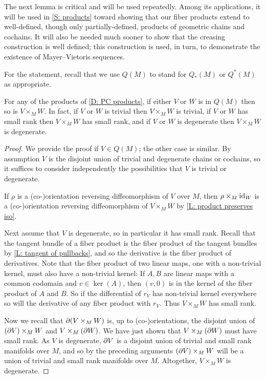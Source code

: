 The next lemma is critical and will be used repeatedly.
Among its applications, it will be used in \cref{S: products} toward showing that our fiber products extend to well-defined, though only partially-defined, products of geometric chains and cochains.
It will also be needed much sooner to show that the creasing construction is well defined; this construction is used, in turn, to demonstrate the existence of Mayer--Vietoris sequences.

For the statement, recall that we use $Q(M)$ to stand for $Q_*(M)$ or $Q^*(M)$ as appropriate.

\begin{lemma}\label{L: pullback with Q}
	For any of the products of \cref{D: PC products}, if either $V$ or $W$ is in $Q(M)$ then so is $V \times_M W$.
	In fact, if $V$ or $W$ is trivial then $V \times_M W$ is trivial, if $V$ or $W$ has small rank then $V \times_M W$ has small rank, and if $V$ or $W$ is degenerate then $V \times_M W$ is degenerate.
\end{lemma}

\begin{proof}
	We provide the proof if $V \in Q(M)$; the other case is similar.
	By assumption $V$ is the disjoint union of trivial and degenerate chains or cochains, so it suffices to consider independently the possibilities that $V$ is trivial or degenerate.

	If $\rho$ is a (co\nobreakdash-)orientation reversing diffeomorphism of $V$ over $M$, then $\rho \times_M \mathrm{id}_W$ is a (co\nobreakdash-)orientation reversing diffeomorphism of $V \times_M W$ by \cref{L: product preserves iso}.

	Next assume that $V$ is degenerate, so in particular it has small rank.
	Recall that the tangent bundle of a fiber product is the fiber product of the tangent bundles by \cref{L: tangent of pullbacks}, and so the derivative is the fiber product of derivatives.
	Note that the fiber product of two linear maps, one with a non-trivial kernel, must also have a non-trivial kernel: If $A,B$ are linear maps with a common codomain and $v \in \ker(A)$, then $(v,0)$ is in the kernel of the fiber product of $A$ and $B$.
	So if the differential of $r_V$ has non-trivial kernel everywhere so will the derivative of any fiber product with $r_V$.
	Thus $V \times_M W$ has small rank.

	Now we recall that $\partial(V \times_M W)$ is, up to (co\nobreakdash-)orientations, the disjoint union of $(\partial V) \times_M W$ and $V \times_M (\partial W)$.
	We have just shown that $V \times_M (\partial W)$ must have small rank.
	As $V$ is degenerate, $\partial V$ is a disjoint union of trivial and small rank manifolds over $M$, and so by the preceding arguments $(\partial V) \times_M W$ will be a union of trivial and small rank manifolds over $M$.
	Altogether, $V \times_M W$ is degenerate.
\end{proof}

